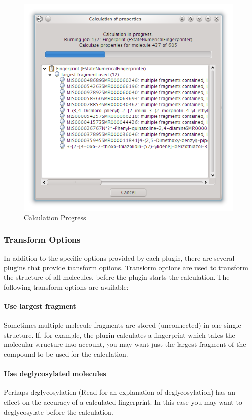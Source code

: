 \begin{figure}[!htb]
   \centering
   \includegraphics[scale=0.6]{images/sh_calculation_progress_dialog.png}
   \caption{Calculation Progress}
   \label{fig:calculationprogress}
\end{figure}

	
\subsubsection{Transform Options} \label{subsec:scaffoldhunter:Transform Options}
In addition to the specific options provided by each plugin, there are several plugins that provide transform options.
Transform options are used to transform the structure of all molecules, before the plugin starts the calculation.
The following transform options are available:
\paragraph{Use largest fragment}
  Sometimes multiple molecule fragments are stored (unconnected) in one single structure.
  If, for example, the plugin calculates a fingerprint which takes the molecular structure into account,
  you may want just the largest fragment of the compound to be used for the calculation.
		      
\paragraph{Use deglycosylated molecules}
  Perhaps deglycosylation (Read  for an explanation of deglycosylation)
  has an effect on the accuracy of a calculated fingerprint.
  In this case you may want to deglycosylate before the calculation.

